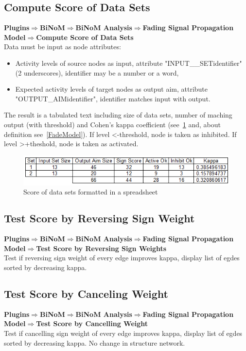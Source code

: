 \subsection{Compute Score of Data Sets }
\textbf{Plugins$\Rightarrow$BiNoM$\Rightarrow$BiNoM Analysis$\Rightarrow$Fading Signal Propagation Model$\Rightarrow$Compute Score of Data Sets}\\
Data must be input as node attributes:
\begin{itemize}
\item Activity levels of source nodes as input, attribute "INPUT\_\_SETidentifier" (2 underscores), identifier may be a number or a word, 
\item Expected activity levels of target nodes as output aim, attribute "OUTPUT\_AIMidentifier", identifier matches input with output.
\end{itemize}
The result is a tabulated text including size of data sets, number of maching output (with threshold) and Cohen's kappa coefficient (see~\ref{Score_Of_Data_Sets} and, about definition see~\ref{FadeModel}).
If level \textless -threshold, node is taken as inhibited. If level \textgreater +theshold, node is taken as activated.

\begin{figure}
\centering
\includegraphics[width=1.0\textwidth]{graphics/Score_Of_Data_Sets}
\caption{Score of data sets formatted in a spreadsheet}
\label{Score_Of_Data_Sets}
\end{figure}

\subsection{Test Score by Reversing Sign Weight }
\textbf{Plugins$\Rightarrow$BiNoM$\Rightarrow$BiNoM Analysis$\Rightarrow$Fading Signal Propagation Model$\Rightarrow$Test Score by Reversing Sign Weights}\\
Test if reversing sign weight of every edge improves kappa, display list of egdes sorted by decreasing kappa.

\subsection{Test Score by Canceling Weight }
\textbf{Plugins$\Rightarrow$BiNoM$\Rightarrow$BiNoM Analysis$\Rightarrow$Fading Signal Propagation Model$\Rightarrow$Test Score by Cancelling Weight}\\
Test if cancelling sign weight of every edge improves kappa, display list of egdes sorted by decreasing kappa. No change in structure network.